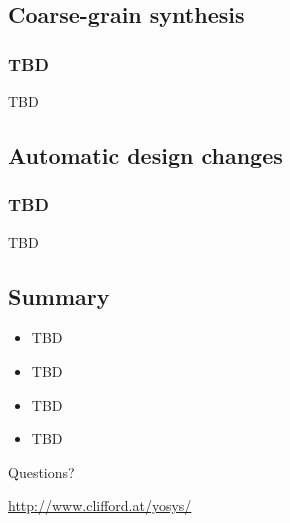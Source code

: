 
\subsection{Coarse-grain synthesis}

\begin{frame}
\subsectionpage
\subsectionpagesuffix
\end{frame}

\subsubsection{TBD}

\begin{frame}{\subsubsecname}
TBD
\end{frame}


\subsection{Automatic design changes}

\begin{frame}
\subsectionpage
\subsectionpagesuffix
\end{frame}

\subsubsection{TBD}

\begin{frame}{\subsubsecname}
TBD
\end{frame}


\subsection{Summary}

\begin{frame}{\subsecname}
\begin{itemize}
\item TBD
\item TBD
\item TBD
\item TBD
\end{itemize}

\bigskip
\bigskip
\begin{center}
Questions?
\end{center}

\bigskip
\bigskip
\begin{center}
\url{http://www.clifford.at/yosys/}
\end{center}
\end{frame}

